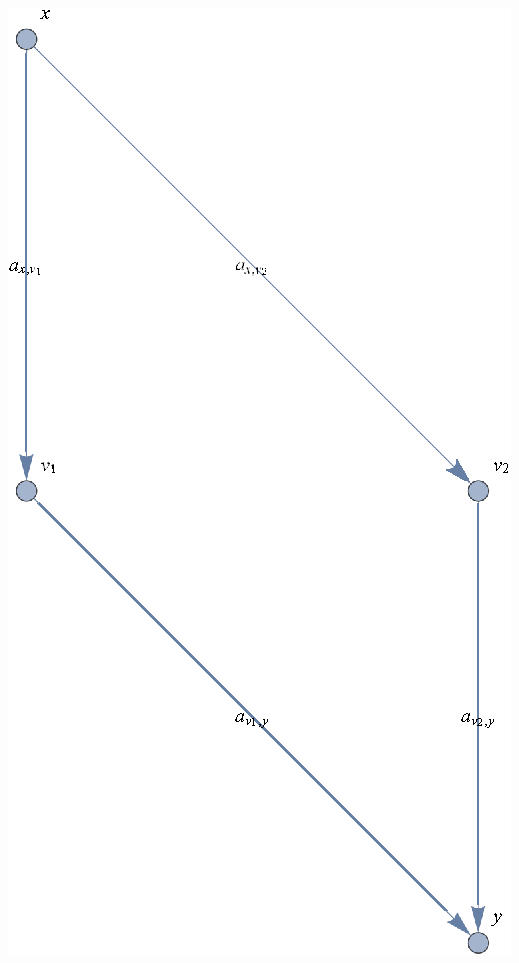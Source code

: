 \documentclass{article}
\newcounter{mathematicafigurecaption}
\begin{document}
\includegraphics{NEOID_gr1.eps}


\caption{\(\text{Figure} \arabic{mathematicafigurecaption}.\)The trust network before adding \(v\)}
\end{document}
